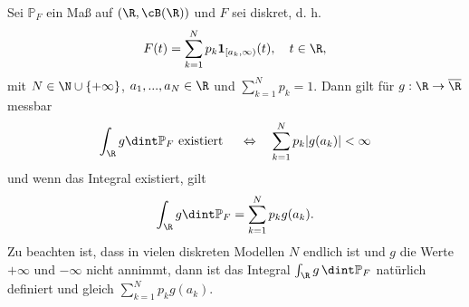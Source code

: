 \begin{satz}\label{IntDiskr}
	Sei $ \mathbb{P}_F $ ein Maß auf $(\R, \cB(\R))$ und $F$ sei diskret, d. h.
	\[ F(t) = \sum\limits_{k = 1}^{N} p_k \mathbf{1}_{[a_k,\infty)}(t), \quad t\in\R, \]
	mit $N \in \N \cup \{ + \infty \}$, $a_1, ..., a_N \in \R$ und $\sum_{k = 1}^{N} p_k = 1$. Dann gilt f\"ur $g:\R\to\overline\R$ messbar
	\[ \int_{\R} g \dint \mathbb{P}_F \text{ existiert }\quad  \Leftrightarrow \quad \sum\limits_{k = 1}^{N} p_k|g(a_k)|<\infty \] und wenn das Integral existiert, gilt  \[ \int_{\R} g \dint \mathbb{P}_F = \sum\limits_{k = 1}^{N} p_kg(a_k) . \]
	Zu beachten ist, dass in vielen diskreten Modellen $N$ endlich ist und $g$ die Werte $+\infty$ und $-\infty$ nicht annimmt, dann ist das Integral $\int_{\R} g\, \dint \mathbb P_F$ nat\"urlich definiert und gleich $\sum\limits_{k = 1}^{N} p_kg(a_k)$.
\end{satz}
